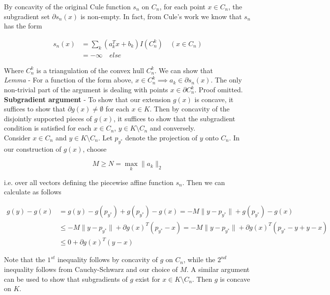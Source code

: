 \documentclass[11pt,reqno]{amsart}
\numberwithin{equation}{section}
\newcommand{\tb}{\textbf}
\newcommand{\pa}{\partial}
\begin{document}
By concavity of the original Cule function $s_n$ on $C_n$, for each point $x \in C_n$, the subgradient set $\pa s_n(x)$ is non-empty. In fact, from Cule's work we know that $s_n$ has the form 

\begin{align*}
s_n(x) &= \sum_k (a_k^T x + b_k) I(C_n^k) \quad (x \in C_n) \\
&= - \infty \quad else
\end{align*}

Where $C_n^k$ is a triangulation of the convex hull $C_n^k$. We can show that \\

\emph{Lemma} - For a function of the form above, $x \in C_n^k \implies a_k \in \pa s_n(x)$. The only non-trivial part of the argument is dealing with points $x \in \pa C_n^k$. Proof omitted. \\

\tb{Subgradient argument} - To show that our extension $g(x)$ is concave, it suffices to show that $\pa g(x) \not = \emptyset$ for each $x \in K$. Then by concavity of the disjointly supported pieces of $g(x)$, it suffices to show that the subgradient condition is satisfied for each $x \in C_n$, $y \in K \setminus C_n$ and conversely. \\

Consider $x \in C_n$ and $y \in K \setminus C_n$. Let $p_{y^*}$ denote the projection of $y$ onto $C_n$. In our construction of $g(x)$, choose 

\[
M \geq N = \max_{k} \|a_k\|_2 
\]

i.e. over all vectors defining the piecewise affine function $s_n$. Then we can calculate as follows 

\begin{align*}
g(y) - g(x) &= g(y) - g(p_{y^*}) + g(p_{y^*}) - g(x) = -M \|y - p_{y^*}\| + g(p_{y^*}) - g(x) \\
&\leq -M \|y - p_{y^*}\| + \pa g(x)^T(p_{y^*} - x) = -M \|y - p_{y^*}\| + \pa g(x)^T(p_{y^*} - y +y - x) \\
&\leq 0 + \pa g(x)^T(y - x) 
\end{align*}

Note that the $1^{st}$ inequality follows by concavity of $g$ on $C_n$, while the $2^{nd}$ inequality follows from Cauchy-Schwarz and our choice of $M$. A similar argument can be used to show that subgradients of $g$ exist for $x \in K \setminus C_n$. Then $g$ is concave on $K$. \\
\end{document}
